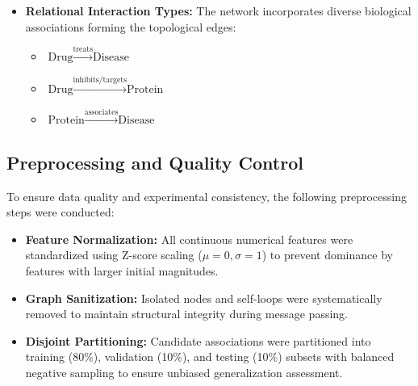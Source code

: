 \documentclass[conference,a4paper]{IEEEtran}
\begin{document}
\begin{itemize}
\begin{equation}
    \end{equation}
    where $\mathbb{I}(v \in \mathcal{V}_{\text{drug}}) \in \{0, 1\}$ is a discrete entity-type indicator. For disease and protein nodes ($v \notin \mathcal{V}_{\text{drug}}$), the chemical projection is nullified ($\mathbf{W}_{\text{chem}}^{(1)} \mathbf{x}_v^{\text{chem}} = \mathbf{0}$), ensuring that non-drug vertices are mapped strictly within the calibrated 128-dimensional textual semantic ontology space (derived from MONDO, HPO, and UniProt definitions). Consequently, small-molecule physicochemical features remain strictly quarantined to compound representations and propagate to downstream biological targets exclusively via multi-hop topological message passing, eliminating modality distortion.
    
    \item \textbf{Relational Interaction Types:} 
    The network incorporates diverse biological associations forming the topological edges:
    \begin{itemize}
        \item $\text{Drug} \xrightarrow{\text{treats}} \text{Disease}$
        \item $\text{Drug} \xrightarrow{\text{inhibits/targets}} \text{Protein}$
        \item $\text{Protein} \xrightarrow{\text{associates}} \text{Disease}$
    \end{itemize}
\end{itemize}

\subsection{Preprocessing and Quality Control}
To ensure data quality and experimental consistency, the following preprocessing steps were conducted:
\begin{itemize}
    \item \textbf{Feature Normalization:} 
    All continuous numerical features were standardized using Z-score scaling ($\mu=0, \sigma=1$) to prevent dominance by features with larger initial magnitudes.
    \item \textbf{Graph Sanitization:} 
    Isolated nodes and self-loops were systematically removed to maintain structural integrity during message passing.
    \item \textbf{Disjoint Partitioning:} 
    Candidate associations were partitioned into training (80\%), validation (10\%), and testing (10\%) subsets with balanced negative sampling to ensure unbiased generalization assessment.
\end{itemize}
\end{document}
